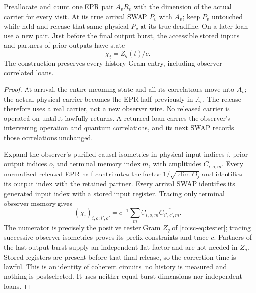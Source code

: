 \begin{lemma}\label{to:sc-lem:recorder}
Preallocate and count one EPR pair $A_vR_v$ with the dimension of the actual carrier for every visit. At its true arrival SWAP $P_v$ with $A_v$; keep $P_v$ untouched while held and release that same physical $P_v$ at its true deadline. On a later loan use a new pair. Just before the final output burst, the accessible stored inputs and partners of prior outputs have state
\begin{equation}\label{to:sc-eq:record}
\chi_t=Z_q(t)/c.
\end{equation}
The construction preserves every history Gram entry, including observer-correlated loans.
\end{lemma}
\begin{proof}
At arrival, the entire incoming state and all its correlations move into $A_v$; the actual physical carrier becomes the EPR half previously in $A_v$. The release therefore uses a real carrier, not a new observer wire. No released carrier is operated on until it lawfully returns. A returned loan carries the observer's intervening operation and quantum correlations, and its next SWAP records those correlations unchanged.

Expand the observer's purified causal isometries in physical input indices $i$, prior-output indices $o$, and terminal memory index $m$, with amplitudes $C_{i,o,m}$. Every normalized released EPR half contributes the factor $1/\sqrt{\dim O_j}$ and identifies its output index with the retained partner. Every arrival SWAP identifies its generated input index with a stored input register. Tracing only terminal observer memory gives
\[
(\chi_t)_{i,o;i',o'}=c^{-1}\sum_m C_{i,o,m}\overline{C_{i',o',m}}.
\]
The numerator is precisely the positive tester Gram $Z_q$ of \eqref{to:sc-eq:tester}; tracing successive observer isometries proves its prefix constraints and trace $c$. Partners of the last output burst supply an independent flat factor and are not needed in $Z_q$. Stored registers are present before that final release, so the correction time is lawful. This is an identity of coherent circuits: no history is measured and nothing is postselected. It uses neither equal burst dimensions nor independent loans.
\end{proof}


